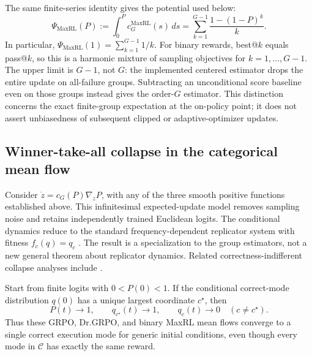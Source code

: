The same finite-series identity gives the potential used below:
\begin{equation}
 \Psi_{\mathrm{MaxRL}}(P)
 :=\int_0^P c_G^{\mathrm{MaxRL}}(s)\,ds
 =\sum_{k=1}^{G-1}\frac{1-(1-P)^k}{k}.
 \label{eq:maxrl-potential-finite-sum}
\end{equation}
In particular, $\Psi_{\mathrm{MaxRL}}(1)=\sum_{k=1}^{G-1}1/k$.
For binary rewards, best@\(k\) equals pass@\(k\), so this is a harmonic
mixture of sampling objectives for $k=1,\ldots,G-1$. The upper limit is
$G-1$, not $G$: the implemented centered estimator drops the entire update
on all-failure groups. Subtracting an unconditional score baseline even on
those groups instead gives the order-$G$ estimator. This distinction concerns
the exact finite-group expectation at the on-policy point; it does not assert
unbiasedness of subsequent clipped or adaptive-optimizer updates.


\subsection{Winner-take-all collapse in the categorical mean flow}
\label{app:theory-collapse}

Consider $\dot z=c_G(P)\nabla_zP$, with any of the three smooth positive
functions established above. This infinitesimal expected-update model removes
sampling noise and retains independently trained Euclidean logits. The
conditional dynamics reduce to the standard frequency-dependent replicator
system with fitness $f_c(q)=q_c$ \citep{hofbauer1998evolutionary}. The result is
a specialization to the group estimators, not a new general theorem about
replicator dynamics. Related correctness-indifferent collapse analyses include
\citet{sinha2026expected,lochab2026ucpo}.

\begin{theorem}
\label{thm:grpo-collapse}
Start from finite logits with $0<P(0)<1$. If the conditional correct-mode
distribution $q(0)$ has a unique largest coordinate $c^\star$, then
\[
  P(t)\longrightarrow1,
  \qquad
  q_{c^\star}(t)\longrightarrow1,
  \qquad
  q_c(t)\longrightarrow0\quad(c\ne c^\star).
\]
Thus these GRPO, Dr.GRPO, and binary MaxRL mean flows converge to a single
correct execution mode for generic initial conditions, even though every mode
in $\mathcal C$ has exactly the same reward.
\end{theorem}

